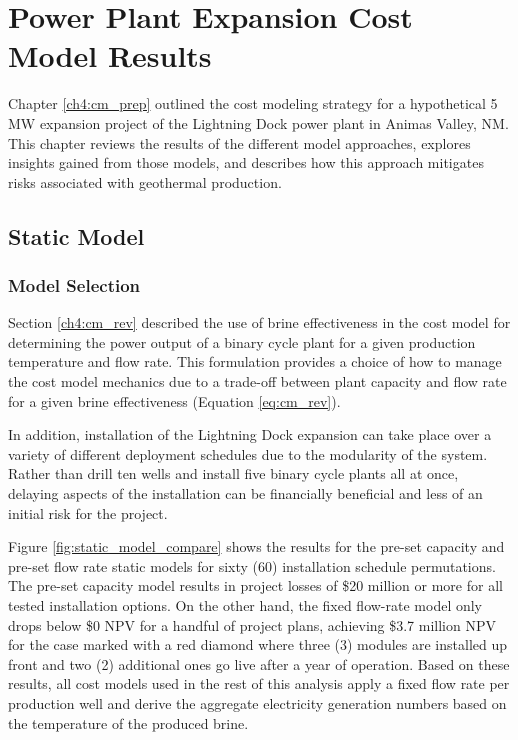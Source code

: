 \chapter{Power Plant Expansion Cost Model Results}\label{ch6:cm_results}

Chapter \ref{ch4:cm_prep} outlined the cost modeling strategy for a hypothetical 5 MW expansion project of the Lightning Dock power plant in Animas Valley, NM. This chapter reviews the results of the different model approaches, explores insights gained from those models, and describes how this approach mitigates risks associated with geothermal production.

\section{Static Model}
\label{ch6:static_mod}

\subsection{Model Selection}
\label{ch6:static_select}

Section \ref{ch4:cm_rev} described the use of brine effectiveness in the cost model for determining the power output of a binary cycle plant for a given production temperature and flow rate. This formulation provides a choice of how to manage the cost model mechanics due to a trade-off between plant capacity and flow rate for a given brine effectiveness (Equation \ref{eq:cm_rev}).

In addition, installation of the Lightning Dock expansion can take place over a variety of different deployment schedules due to the modularity of the system. Rather than drill ten wells and install five binary cycle plants all at once, delaying aspects of the installation can be financially beneficial and less of an initial risk for the project.

Figure \ref{fig:static_model_compare} shows the results for the pre-set capacity and pre-set flow rate static models for sixty (60) installation schedule permutations. The pre-set capacity model results in project losses of \$20 million or more for all tested installation options. On the other hand, the fixed flow-rate model only drops below \$0 NPV for a handful of project plans, achieving \$3.7 million NPV for the case marked with a red diamond where three (3) modules are installed up front and two (2) additional ones go live after a year of operation. Based on these results, all cost models used in the rest of this analysis apply a fixed flow rate per production well and derive the aggregate electricity generation numbers based on the temperature of the produced brine.

